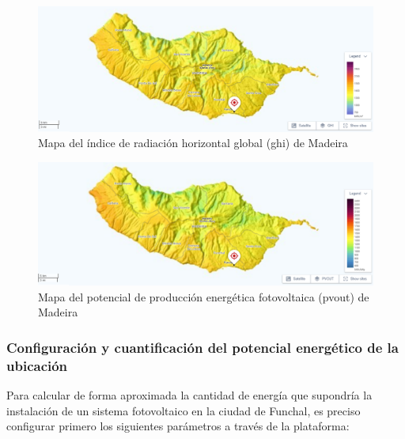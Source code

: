 \begin{figure}[H]
    \centering
    \includegraphics[width=1\textwidth]{img/diseno/madeiraghi.png}
    \caption{Mapa del índice de radiación horizontal global (\acrshort{ghi}) de Madeira \cite{globalsolar}}
    \label{fig:madeiraghi}
\end{figure}

\begin{figure}[H]
    \centering
    \includegraphics[width=1\textwidth]{img/diseno/madeirapvout.png}
    \caption{Mapa del potencial de producción energética fotovoltaica (\acrshort{pvout}) de Madeira \cite{globalsolar}}
    \label{fig:madeirapvout}
\end{figure}

\pagebreak

\subsubsection{Configuración y cuantificación del potencial energético de la ubicación}

Para calcular de forma aproximada la cantidad de energía que supondría la instalación de un sistema fotovoltaico en la ciudad de Funchal, es preciso configurar primero los siguientes parámetros a través de la plataforma:

